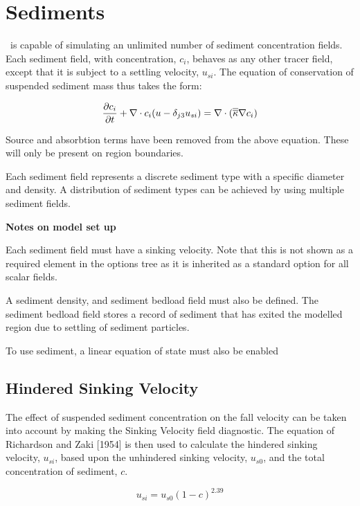 \section{Sediments}

\fluidity\ is capable of simulating an unlimited number of sediment concentration fields. 
Each sediment field, with concentration, $c_{i}$, behaves as any other tracer field, except 
that it is subject to a settling velocity, $u_{si}$. The equation of conservation of
suspended sediment mass thus takes the form:

\begin{equation}\label{eq:sediment_conc}
\frac{\partial c_i}{\partial t} + \nabla\cdot c_i(u - \delta_{j3}u_{si}) = \nabla\cdot(\overline{\overline{\kappa}}\nabla c_i)
\end{equation}

Source and absorbtion terms have been removed from the above equation. These will only be
present on region boundaries.

Each sediment field represents a discrete sediment type with a specific diameter and
density. A distribution of sediment types can be achieved by using multiple sediment fields.

{\bf Notes on model set up}

Each sediment field must have a sinking velocity. Note that this is not shown as a
required element in the options tree as it is inherited as a standard option for all
scalar fields.

A sediment density, and sediment bedload field must also be defined. The sediment
bedload field stores a record of sediment that has exited the modelled region due to
settling of sediment particles.

To use sediment, a linear equation of state must also be enabled

\subsection{Hindered Sinking Velocity}

The effect of suspended sediment concentration on the fall velocity can be taken into account 
by making the Sinking Velocity field diagnostic. The equation of Richardson and Zaki [1954] 
is then used to calculate the hindered sinking velocity, $u_{si}$, based upon the unhindered 
sinking velocity, $u_{s0}$, and the total concentration of sediment, $c$.

\begin{equation}\label{eq:hindered_sinking_velocity}
u_{si} = u_{s0}(1-c)^{2.39}
\end{equation}

